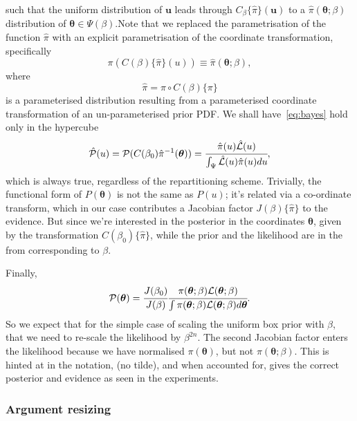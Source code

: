 \documentclass[usenatbib]{mnras}
\begin{document}
such that
the uniform distribution of \(\bm{u}\) leads through
\(C_{\beta}\{\hat{\pi}\}(\bm{u})\) to a \(\hat{\pi}(\bm{\theta};\beta)\)
distribution of \(\bm{\theta} \in\Psi(\beta)\).Note that we replaced the
parametrisation of the function \(\hat{\pi}\) with an explicit
parametrisation of the coordinate transformation, specifically
\begin{equation}
  \pi(C(\beta)\{\hat{\pi}\}(u)) \equiv \hat{\pi}(\bm{\theta}; \beta),
\end{equation}
where 
\begin{equation}
  \hat{\pi} =  \pi \circ C(\beta) \{ \pi \} 
\end{equation}
is a parameterised distribution resulting from a parameterised
coordinate transformation of an un-parameterised prior PDF. We shall
have~\vref{eq:bayes} hold only in the hypercube
\begin{equation}
{\cal \hat{P}}(u) = {\cal P}(C(\beta_{0}){\hat{\pi}}^{-1}(\bm{\theta})) = \cfrac{\hat{\pi} (u) {\cal \hat{L}}(u)}{\int_{\Psi}{\cal \hat{L}}(u) \hat{\pi}(u) du},
\end{equation}
which is always true, regardless of the repartitioning
scheme. Trivially, the functional form of \(P(\bm{\theta})\) is not the same
as \(P(u)\); it's related via a co-ordinate transform, which in our
case contributes a Jacobian factor \(J(\beta)\{\hat{\pi}\}\) to the
evidence. But since we're interested in the posterior in the
coordinates \(\bm{\theta}\), given by the transformation \(C(\beta_{0})\{\hat{\pi}\}\),
while the prior and the likelihood are in the from corresponding
to \(\beta\).

Finally, 
\begin{equation}
 {\cal P}(\bm{\theta}) = \cfrac{J(\beta_{0})}{J(\beta)} \cfrac{\pi(\bm{\theta}; \beta) {\cal L}(\bm{\theta}; \beta)}{\int \pi(\bm{\theta}; \beta) {\cal L}(\bm{\theta}; \beta) d \bm{\theta}}.
\end{equation}
So we expect that for the simple case of scaling the uniform box
prior with \(\beta\), that we need to re-scale the likelihood by
\(\beta^{2n}\). The second Jacobian factor enters the likelihood because
we have normalised \(\pi(\bm{\theta})\), but not \(\pi(\bm{\theta}; \beta)\). This is hinted at in
the notation, (no tilde), and when accounted for, gives  the correct
posterior and evidence as seen in the experiments.

\subsubsection{Argument resizing}\label{sec:orgfe92f25}
\end{document}
